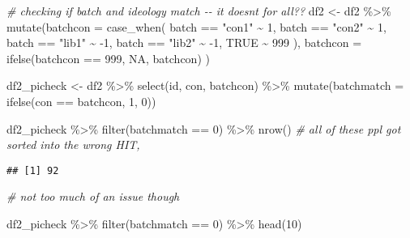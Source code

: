 \documentclass[
]{article}
\newenvironment{Shaded}{\begin{snugshade}}{\end{snugshade}}
\newcommand{\AttributeTok}[1]{\textcolor[rgb]{0.77,0.63,0.00}{#1}}
\newcommand{\CommentTok}[1]{\textcolor[rgb]{0.56,0.35,0.01}{\textit{#1}}}
\newcommand{\ConstantTok}[1]{\textcolor[rgb]{0.00,0.00,0.00}{#1}}
\newcommand{\DecValTok}[1]{\textcolor[rgb]{0.00,0.00,0.81}{#1}}
\newcommand{\FunctionTok}[1]{\textcolor[rgb]{0.00,0.00,0.00}{#1}}
\newcommand{\NormalTok}[1]{#1}
\newcommand{\OtherTok}[1]{\textcolor[rgb]{0.56,0.35,0.01}{#1}}
\newcommand{\SpecialCharTok}[1]{\textcolor[rgb]{0.00,0.00,0.00}{#1}}
\newcommand{\StringTok}[1]{\textcolor[rgb]{0.31,0.60,0.02}{#1}}
\begin{document}
\begin{Shaded}
\begin{Highlighting}[]
\CommentTok{\# checking if batch and ideology match {-}{-} it doesn\textquotesingle{}t for all??}
\NormalTok{df2 }\OtherTok{\textless{}{-}}\NormalTok{ df2 }\SpecialCharTok{\%\textgreater{}\%} 
  \FunctionTok{mutate}\NormalTok{(}\AttributeTok{batchcon =} \FunctionTok{case\_when}\NormalTok{(}
\NormalTok{    batch }\SpecialCharTok{==} \StringTok{"con1"} \SpecialCharTok{\textasciitilde{}} \DecValTok{1}\NormalTok{,}
\NormalTok{    batch }\SpecialCharTok{==} \StringTok{"con2"} \SpecialCharTok{\textasciitilde{}} \DecValTok{1}\NormalTok{,}
\NormalTok{    batch }\SpecialCharTok{==} \StringTok{"lib1"} \SpecialCharTok{\textasciitilde{}} \SpecialCharTok{{-}}\DecValTok{1}\NormalTok{,}
\NormalTok{    batch }\SpecialCharTok{==} \StringTok{"lib2"} \SpecialCharTok{\textasciitilde{}} \SpecialCharTok{{-}}\DecValTok{1}\NormalTok{,}
    \ConstantTok{TRUE} \SpecialCharTok{\textasciitilde{}} \DecValTok{999}
\NormalTok{    ),}
    \AttributeTok{batchcon =} \FunctionTok{ifelse}\NormalTok{(batchcon }\SpecialCharTok{==} \DecValTok{999}\NormalTok{, }\ConstantTok{NA}\NormalTok{, batchcon)}
\NormalTok{  )}

\NormalTok{df2\_picheck }\OtherTok{\textless{}{-}}\NormalTok{ df2 }\SpecialCharTok{\%\textgreater{}\%} 
  \FunctionTok{select}\NormalTok{(id, con, batchcon) }\SpecialCharTok{\%\textgreater{}\%} 
  \FunctionTok{mutate}\NormalTok{(}\AttributeTok{batchmatch =} \FunctionTok{ifelse}\NormalTok{(con }\SpecialCharTok{==}\NormalTok{ batchcon, }\DecValTok{1}\NormalTok{, }\DecValTok{0}\NormalTok{))}

\NormalTok{df2\_picheck }\SpecialCharTok{\%\textgreater{}\%} 
  \FunctionTok{filter}\NormalTok{(batchmatch }\SpecialCharTok{==} \DecValTok{0}\NormalTok{) }\SpecialCharTok{\%\textgreater{}\%} 
  \FunctionTok{nrow}\NormalTok{() }\CommentTok{\# all of these ppl got sorted into the wrong HIT,}
\end{Highlighting}
\end{Shaded}

\begin{verbatim}
## [1] 92
\end{verbatim}

\begin{Shaded}
\begin{Highlighting}[]
\CommentTok{\# not too much of an issue though}

\NormalTok{df2\_picheck }\SpecialCharTok{\%\textgreater{}\%} 
  \FunctionTok{filter}\NormalTok{(batchmatch }\SpecialCharTok{==} \DecValTok{0}\NormalTok{) }\SpecialCharTok{\%\textgreater{}\%} 
  \FunctionTok{head}\NormalTok{(}\DecValTok{10}\NormalTok{) }
\end{Highlighting}
\end{Shaded}
\end{document}
